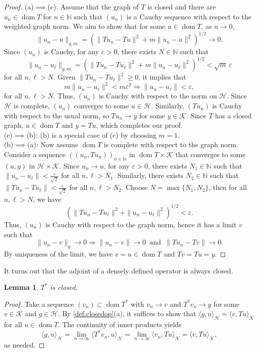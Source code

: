 \documentclass[11pt]{article}
\newtheorem{lemma}[theorem]{Lemma}
\theoremstyle{definition}
\theoremstyle{remark}
\DeclareMathOperator\dom{dom}
\newcommand{\Hh}{\mathcal{H}}
\newcommand{\N}{\mathbb{N}}
\begin{document}
\begin{proof}
    (a)$\implies$(c): Assume that the graph of $T$ is closed and there are $u_n \in \dom T$ for $n \in \N$ such that $(u_n)$ is a Cauchy sequence with respect to the weighted graph norm. We aim to show that for some $u\in \dom T$, as $n \to 0$, 
    $$
    \|u_{n}-u\|_{g,m} = (\|Tu_{n}-Tu\|^2+m\|u_{n}-u\|^2)^{1/2} \to 0.
    $$
    Since $(u_n)$ is Cauchy, for any $\varepsilon>0$, there exists $N\in\mathbb{N}$ such that
    $$
    \|u_n-u_\ell\|_{g,m}=(\|Tu_n-Tu_\ell\|^2+m\|u_n-u_\ell\|^2)^{1/2}<\sqrt{m}\, \varepsilon
    $$
    for all $n,\ell>N$. Given $\|Tu_n-Tu_\ell\|^2\geq 0$, it implies that
    $$
    m\|u_n-u_\ell\|^2<m\varepsilon^2 \Longrightarrow \|u_n-u_\ell\|<\varepsilon,
    $$
    for all $n,\ell>N$. Thus, $(u_n)$ is Cauchy with respect to the norm on $\Hh$. Since $\mathcal{H}$ is complete, $(u_{n})$ converges to some $u\in\mathcal{H}$. Similarly, $(Tu_n)$ is Cauchy with respect to the usual norm, so $Tu_{n}\to y$ for some $y\in\mathcal{K}$. Since $T$ has a closed graph, $u\in\dom T$ and $y=Tu$, which completes our proof.\\

    \noindent (c)$\implies$(b): (b) is a special case of (c) by choosing $m=1$.\\

    \noindent (b)$\implies$(a): Now assume $\dom T$ is complete with respect to the graph norm. Consider a sequence
    $((u_n,Tu_n))_{n\in \mathbb{N}}$ in $\dom T \times \mathcal{K}$ that converges to some $(u,y)$ in $\mathcal{H}\times \mathcal{K}$. Since $u_n \to u$, for any $\varepsilon>0$, there exists $N_1\in\mathbb{N}$ such that $\|u_n-u_\ell\|<\frac{\varepsilon}{\sqrt{2}}$ for all $n,\ell>N_1$. Similarly, there exists $N_2\in\mathbb{N}$ such that $\|Tu_n-Tu_\ell\|<\frac{\varepsilon}{\sqrt{2}}$ for all $n,\ell>N_2$. Choose $N = \max\{N_1,N_2\}$, then for all $n,\ell>N$, we have
    $$
    (\|Tu_n-Tu_\ell\|^2+\|u_n-u_\ell\|^2)^{1/2}<\varepsilon.
    $$
    Thus, $(u_n)$ is Cauchy with respect to the graph norm, hence it has a limit $v$ such that 
    $$
    \|u_n-v\|_g\to 0 \Longrightarrow \|u_n-v\| \to 0 \ \text{ and }\ \|Tu_n-Tv\| \to 0.
    $$
    By uniqueness of the limit, we have $v=u\in \dom T$ and $Tv=Tu=y$.
\end{proof}


It turns out that the adjoint of a densely defined operator is always closed.
\begin{lemma}\label{T^* closed}
    $T^*$ is closed.
\end{lemma}
\begin{proof}
    Take a sequence $(v_n)\subset \dom T^*$ with $v_n\to v$ and $T^*v_n \to g$ for some $v \in \mathcal{K}$ and $g\in\mathcal{H}$. By \cref{def:closedop}(a), it suffices to show that $\langle g,u\rangle_\mathcal{H}=\langle v,Tu\rangle_\mathcal{K}$ for all $u\in \dom T$. The continuity of inner products yields
    $$
        \langle g,u\rangle_\mathcal{H} = \lim_{n\to\infty}\langle T^*v_n,u\rangle_\mathcal{H}=\lim_{n\to\infty}\langle v_n,Tu\rangle_\mathcal{K}=\langle v,Tu\rangle_\mathcal{K},
    $$
    as needed.
\end{proof}
\end{document}
